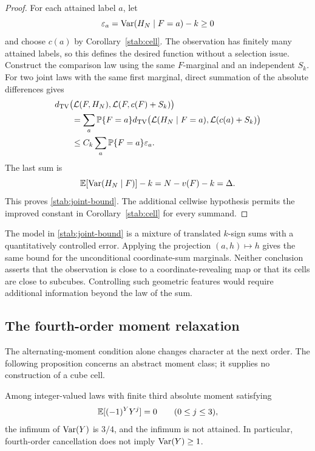 \begin{proof}
For each attained label \(a\), let
\[
\varepsilon_a=\operatorname{Var}(H_N\mid F=a)-k\ge0
\]
and choose \(c(a)\) by Corollary~\ref{stab:cell}.  The observation
has finitely many attained labels, so this defines the desired function
without a selection issue.  Construct the comparison law using the
same \(F\)-marginal and an independent \(S_k\).
For two joint laws with the same first marginal, direct summation of
the absolute differences gives
\begin{align*}
&d_{\mathrm{TV}}\bigl(\mathcal L(F,H_N),\mathcal L(F,c(F)+S_k)\bigr)\\
&\qquad=
\sum_a\mathbb P\{F=a\}
d_{\mathrm{TV}}\bigl(\mathcal L(H_N\mid F=a),\mathcal L(c(a)+S_k)\bigr)\\
&\qquad\le C_k\sum_a\mathbb P\{F=a\}\varepsilon_a.
\end{align*}
The last sum is
\[
\mathbb E[\operatorname{Var}(H_N\mid F)]-k
=N-v(F)-k=\Delta.
\]
This proves \eqref{stab:joint-bound}.  The additional cellwise
hypothesis permits the improved constant in
Corollary~\ref{stab:cell} for every summand.
\end{proof}

\begin{remark}
The model in \eqref{stab:joint-bound} is a mixture of translated
\(k\)-sign sums with a quantitatively controlled error.  Applying the
projection \((a,h)\mapsto h\) gives the same bound for the
unconditional coordinate-sum marginals.  Neither conclusion asserts
that the observation is close to a coordinate-revealing map or that
its cells are close to subcubes.  Controlling such geometric features
would require additional information beyond the law of the sum.
\end{remark}

\subsection{The fourth-order moment relaxation}

The alternating-moment condition alone changes character at the next
order.  The following proposition concerns an abstract moment class;
it supplies no construction of a cube cell.

\begin{proposition}
\label{codim:four-relaxation}
Among integer-valued laws with finite third absolute moment satisfying
\[
\mathbb E[(-1)^Y Y^j]=0\qquad(0\le j\le3),
\]
the infimum of \(\operatorname{Var}(Y)\) is \(3/4\), and the infimum is not
attained.  In particular, fourth-order cancellation does not imply
\(\operatorname{Var}(Y)\ge1\).
\end{proposition}


